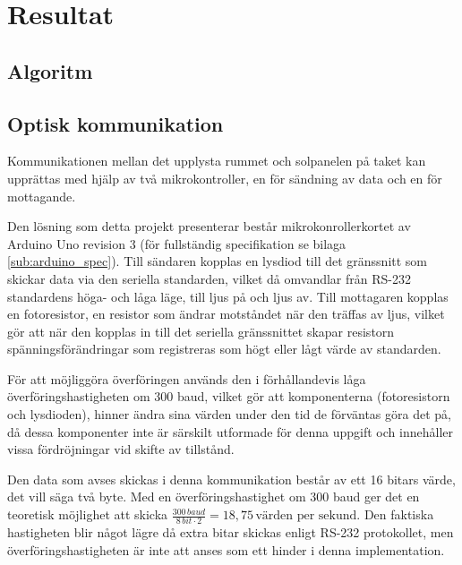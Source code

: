 \section{Resultat} %
\label{sec:resultat}
    \subsection{Algoritm} %
    \label{sub:algoritm}

    \subsection{Optisk kommunikation} %
    \label{sub:optisk_kommunikation}

        Kommunikationen mellan det upplysta rummet och solpanelen på taket kan upprättas med hjälp av två mikrokontroller, en för sändning av data och en för mottagande.\bigskip

        Den lösning som detta projekt presenterar består mikrokonrollerkortet av Arduino Uno revision 3 (för fullständig specifikation se bilaga \ref{sub:arduino_spec}).\cite{ardu} Till sändaren kopplas en lysdiod till det gränssnitt som skickar data via den seriella standarden, vilket då omvandlar från RS-232 standardens höga- och låga läge, till ljus på och ljus av. Till mottagaren kopplas en fotoresistor, en resistor som ändrar motståndet när den träffas av ljus, vilket gör att när den kopplas in till det seriella gränssnittet skapar resistorn spänningsförändringar som registreras som högt eller lågt värde av standarden. \bigskip

        För att möjliggöra överföringen används den i förhållandevis låga överföringshastigheten om 300 baud, vilket gör att komponenterna (fotoresistorn och lysdioden), hinner ändra sina värden under den tid de förväntas göra det på, då dessa komponenter inte är särskilt utformade för denna uppgift och innehåller vissa fördröjningar vid skifte av tillstånd. \bigskip

        Den data som avses skickas i denna kommunikation består av ett 16 bitars värde, det vill säga två byte. Med en överföringshastighet om 300 baud ger det en teoretisk möjlighet att skicka $\frac{300 \,\textit{baud}}{8 \, bit \cdot 2} = 18,75 \, \text{värden per sekund}$. Den faktiska hastigheten blir något lägre då extra bitar skickas enligt RS-232 protokollet, men överföringshastigheten är inte att anses som ett hinder i denna implementation.

